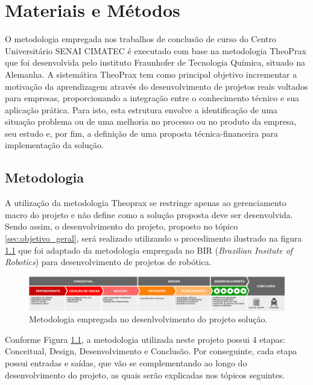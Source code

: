 \chapter{Materiais e Métodos}
\label{chap:materiais_metodos}
O metodologia empregada nos trabalhos de conclusão de curso do Centro Universitário SENAI CIMATEC é executado com base na metodologia TheoPrax que foi desenvolvida pelo instituto Fraunhofer de Tecnologia Química, situado na Alemanha. A sistemática TheoPrax tem como principal objetivo incrementar a motivação da aprendizagem através do desenvolvimento de projetos reais voltados para empresas, proporcionando a integração entre o conhecimento técnico e sua aplicação prática. Para isto, esta estrutura envolve a identificação de uma situação problema ou de uma melhoria no processo ou no produto da empresa, seu estudo e, por fim, a definição de uma proposta técnica-financeira para implementação da solução.

\section{Metodologia}
\label{sec:metodologia}
A utilização da metodologia Theoprax se restringe apenas ao gerenciamento macro do projeto e não define como a solução proposta deve ser desenvolvida. Sendo assim, o desenvolvimento do projeto, proposto no tópico \ref{sec:objetivo_geral}, será realizado utilizando o procedimento ilustrado na figura \ref{fig:metodologia_diagrama} que foi adaptado da metodologia empregada no BIR (\textit{Brazilian Insitute of Robotics}) para desenvolvimento de projetos de robótica.

\begin{figure}[H]
	\label{fig:metodologia_diagrama}
	\centering
	\caption{Metodologia empregada no desenlvolvimento do projeto solução.}
	\includegraphics[width=1\textwidth]
	{Figures/metodologia_diagrama}
\end{figure}	

Conforme Figura \ref{fig:metodologia_diagrama}, a metodologia utilizada neste projeto possui 4 etapas: Conceitual, Design, Desenvolvimento e Conclusão. Por conseguinte, cada etapa possui entradas e saídas, que vão se complementando ao longo do desenvolvimento do projeto, as quais serão explicadas nos tópicos seguintes.


